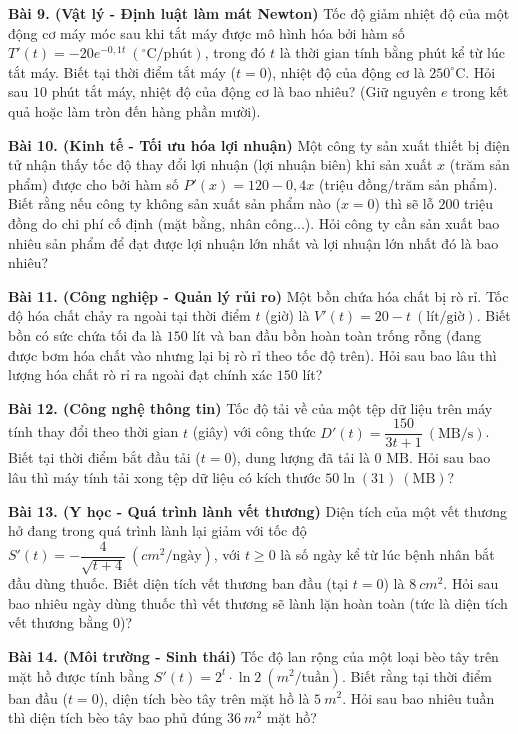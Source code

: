 \documentclass[12pt]{article}
\begin{document}
	\begin{btvang}[]
		\textbf{Bài 9. (Vật lý - Định luật làm mát Newton)} Tốc độ giảm nhiệt độ của một động cơ máy móc sau khi tắt máy được mô hình hóa bởi hàm số $T'(t) = -20e^{-0,1t} \ (^\circ\text{C}/\text{phút})$, trong đó $t$ là thời gian tính bằng phút kể từ lúc tắt máy. Biết tại thời điểm tắt máy ($t = 0$), nhiệt độ của động cơ là $250^\circ\text{C}$. Hỏi sau $10$ phút tắt máy, nhiệt độ của động cơ là bao nhiêu? (Giữ nguyên $e$ trong kết quả hoặc làm tròn đến hàng phần mười).
		
		\textbf{Bài 10. (Kinh tế - Tối ưu hóa lợi nhuận)} Một công ty sản xuất thiết bị điện tử nhận thấy tốc độ thay đổi lợi nhuận (lợi nhuận biên) khi sản xuất $x$ (trăm sản phẩm) được cho bởi hàm số $P'(x) = 120 - 0,4x$ (triệu đồng/trăm sản phẩm). Biết rằng nếu công ty không sản xuất sản phẩm nào ($x = 0$) thì sẽ lỗ $200$ triệu đồng do chi phí cố định (mặt bằng, nhân công...). Hỏi công ty cần sản xuất bao nhiêu sản phẩm để đạt được lợi nhuận lớn nhất và lợi nhuận lớn nhất đó là bao nhiêu?
		
		\textbf{Bài 11. (Công nghiệp - Quản lý rủi ro)} Một bồn chứa hóa chất bị rò rỉ. Tốc độ hóa chất chảy ra ngoài tại thời điểm $t$ (giờ) là $V'(t) = 20 - t \ (\text{lít/giờ})$. Biết bồn có sức chứa tối đa là $150$ lít và ban đầu bồn hoàn toàn trống rỗng (đang được bơm hóa chất vào nhưng lại bị rò rỉ theo tốc độ trên). Hỏi sau bao lâu thì lượng hóa chất rò rỉ ra ngoài đạt chính xác $150$ lít?
		
		\textbf{Bài 12. (Công nghệ thông tin)} Tốc độ tải về của một tệp dữ liệu trên máy tính thay đổi theo thời gian $t$ (giây) với công thức $D'(t) = \dfrac{150}{3t + 1} \ (\text{MB/s})$. Biết tại thời điểm bắt đầu tải ($t = 0$), dung lượng đã tải là $0 \text{ MB}$. Hỏi sau bao lâu thì máy tính tải xong tệp dữ liệu có kích thước $50\ln(31) \ (\text{MB})$?
		
		\textbf{Bài 13. (Y học - Quá trình lành vết thương)} Diện tích của một vết thương hở đang trong quá trình lành lại giảm với tốc độ $S'(t) = -\dfrac{4}{\sqrt{t + 4}} \ (cm^2/\text{ngày})$, với $t \ge 0$ là số ngày kể từ lúc bệnh nhân bắt đầu dùng thuốc. Biết diện tích vết thương ban đầu (tại $t = 0$) là $8 \ cm^2$. Hỏi sau bao nhiêu ngày dùng thuốc thì vết thương sẽ lành lặn hoàn toàn (tức là diện tích vết thương bằng $0$)?
		
		\textbf{Bài 14. (Môi trường - Sinh thái)} Tốc độ lan rộng của một loại bèo tây trên mặt hồ được tính bằng $S'(t) = 2^t \cdot \ln 2 \ (m^2/\text{tuần})$. Biết rằng tại thời điểm ban đầu ($t = 0$), diện tích bèo tây trên mặt hồ là $5 \ m^2$. Hỏi sau bao nhiêu tuần thì diện tích bèo tây bao phủ đúng $36 \ m^2$ mặt hồ?
		

\end{btvang}
\end{document}

